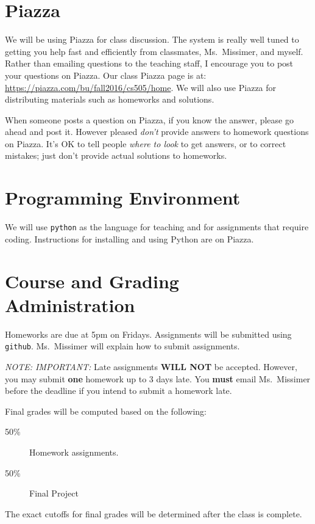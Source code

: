 \documentclass[11pt]{article}
\begin{document}
\section*{Piazza}

We will be using Piazza for class discussion. The system is really well
tuned to getting you help fast and efficiently from classmates, Ms.\ Missimer,
and myself. Rather than emailing questions to the teaching staff,
I encourage you to post your questions on Piazza.   Our class Piazza
page  is at: \url{https://piazza.com/bu/fall2016/cs505/home}. 
We will also use Piazza for distributing materials
such as homeworks and solutions.

When someone posts a question on Piazza, if you know the answer, please
go ahead and post it.   However pleased \emph{don't} provide answers to homework
questions on Piazza.   It's OK to tell people \emph{where to look} to
get answers, or to correct mistakes;  just don't provide actual solutions
to homeworks.

\section*{Programming Environment}

We will use \texttt{python} as the language for teaching and for
assignments that require coding.    Instructions for installing and
using Python are on Piazza.

\section*{Course and Grading Administration}

Homeworks are due at 5pm on Fridays.
Assignments will be submitted using \texttt{github}.   Ms.\ Missimer will
explain how to submit assignments.  

\emph{NOTE: IMPORTANT:} Late assignments \textbf{WILL NOT} be accepted. 
However, you may submit \textbf{one} homework up to 3 days late.   You
\textbf{must} email Ms.\ Missimer before the deadline if you intend to
submit a homework late. 

Final grades will be computed based on the following:
\begin{description}
\item[50\%] Homework assignments.  
\item[50\%] Final Project
\end{description}

The exact cutoffs for final grades will be determined after the class is
complete.
\end{document}

